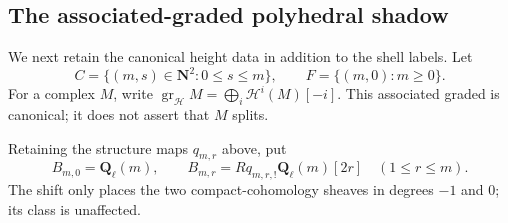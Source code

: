 \documentclass[11pt]{article}
\theoremstyle{definition}
\theoremstyle{remark}
\newcommand{\Qell}{\mathbf Q_\ell}
\begin{document}
\subsection{The associated-graded polyhedral shadow}

We next retain the canonical height data in addition to the shell labels.  Let
\[
 C=\{(m,s)\in\mathbf N^2:0\le s\le m\},
 \qquad F=\{(m,0):m\ge0\}.
\]
For a complex $M$, write
$\operatorname{gr}_{\mathcal H}M=\bigoplus_i\mathcal H^i(M)[-i]$.
This associated graded is canonical; it does not assert that $M$ splits.

Retaining the structure maps $q_{m,r}$ above, put
\begin{equation}
 B_{m,0}=\Qell(m),\qquad
 B_{m,r}=Rq_{m,r,!}\Qell(m)[2r]\quad(1\le r\le m).
 \label{eq:PGL2-normalized-shell-complexes}
\end{equation}
The shift only places the two compact-cohomology sheaves in degrees $-1$ and
$0$; its class is unaffected.
\end{document}
